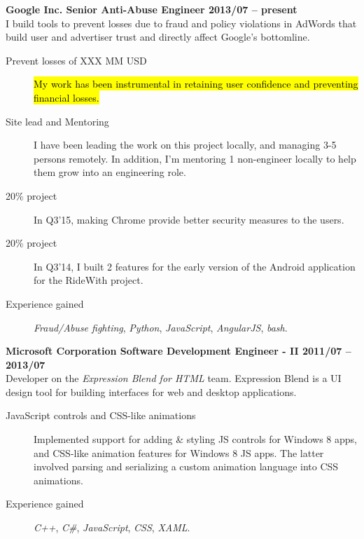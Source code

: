 \documentclass[margin,line]{resume}
\begin{document}
\begin{resume}
\textbf{Google Inc. \hfill Senior Anti-Abuse Engineer \hfill 2013/07 -- present}\\
I build tools to prevent losses due to fraud and policy violations in AdWords that build user and advertiser trust and directly affect Google's bottomline.
\begin{description}
\item [Prevent losses of XXX MM USD] \hl{My work has been instrumental in retaining user confidence and preventing financial losses.}
\item [Site lead and Mentoring] I have been leading the work on this project locally, and managing 3-5 persons remotely. In addition, I'm mentoring 1 non-engineer locally to help them grow into an engineering role.
\item [20\% project] In Q3'15, making Chrome provide better security measures to the users. 
\item [20\% project] In Q3'14, I built 2 features for the early version of the Android application for the RideWith project.
\item [Experience gained] \textit{Fraud/Abuse fighting}, \textit{Python}, \textit{JavaScript}, \textit{AngularJS}, \textit{bash}.
\end{description}
\hrulefill

\textbf{Microsoft Corporation \hfill Software Development Engineer - II \hfill 2011/07 -- 2013/07}\\%
Developer on the \textit{Expression Blend for HTML} team. Expression Blend is a UI design tool for building interfaces for web and desktop applications.
\begin{description}
\item [JavaScript controls and CSS-like animations] Implemented support for adding \& styling JS controls for Windows 8 apps, and CSS-like animation features for Windows 8 JS apps. The latter involved parsing and serializing a custom animation language into CSS animations.
\item [Experience gained] \textit{C++}, \textit{C\#}, \textit{JavaScript}, \textit{CSS}, \textit{XAML}.
\end{description}
\hrulefill


\end{resume}
\end{document}
